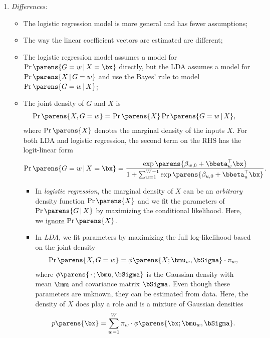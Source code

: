 \documentclass[12pt]{article}
\begin{document}
\begin{enumerate}[label=\textbf{\arabic*.}]
\begin{enumerate}
		\item \textit{Differences:} 
		\begin{itemize}
			\item The logistic regression model is more general and has fewer assumptions; 
			\item The way the linear coefficient vectors are estimated are different; 
			\item The logistic regression model assumes a model for $\Pr \parens{G = w \,\vert\, X = \bx}$ directly, but the LDA assumes a model for $\Pr \parens{X \,\vert\, G = w}$ and use the Bayes' rule to model $\Pr \parens{G = w \,\vert\, X}$; 
			\item The joint density of $G$ and $X$ is 
			\begin{align*}
				\Pr \parens{X, G = w} = & \, \Pr \parens{X} \Pr \parens{G = w \,\vert\, X}, 
			\end{align*}
			where $\Pr \parens{X}$ denotes the marginal density of the inputs $X$. For both LDA and logistic regression, the second term on the RHS has the logit-linear form
			\begin{align*}
				\Pr \parens{G = w \,\vert\, X = \bx} = \frac{\exp \parens{\beta_{w,0} + \bbeta_w^\top \bx}}{1 + \sum_{u=1}^{W-1} \exp \parens{\beta_{u, 0} + \bbeta_{u}^\top \bx}}. 
			\end{align*}
			\begin{itemize}
				\item In \textit{logistic regression}, the marginal density of $X$ can be an \emph{arbitrary} density function $\Pr \parens{X}$ and we fit the parameters of $\Pr \parens{G \,\vert\, X}$ by maximizing the conditional likelihood. Here, we \underline{ignore} $\Pr \parens{X}$. 
				\item In \textit{LDA}, we fit parameters by maximizing the full log-likelihood based on the joint density 
				\begin{align*}
					\Pr \parens{X, G = w} = \phi \parens{X; \bmu_w, \bSigma} \cdot \pi_w, 
				\end{align*}
				where $\phi \parens{\,\cdot\,; \bmu, \bSigma}$ is the Gaussian density with mean $\bmu$ and covariance matrix $\bSigma$. Even though these parameters are unknown, they can be estimated from data. Here, the density of $X$ does play a role and is a mixture of Gaussian densities 
				\begin{align*}
					p \parens{\bx} = \sum_{w=1}^W \pi_w \cdot \phi \parens{\bx; \bmu_w, \bSigma}. 
				\end{align*}
			\end{itemize}
		

\end{itemize}
\end{enumerate}
\end{enumerate}
\end{document}
